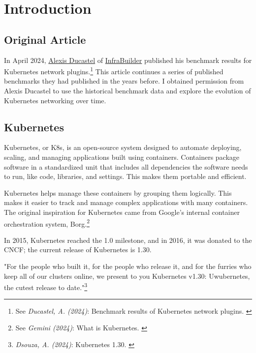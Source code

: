 %
%

\pagebreak
\section{Introduction}

\onehalfspacing

\subsection{Original Article}

In April 2024, \href{https://www.linkedin.com/in/alexisducastel/}{Alexis Ducastel} of \href{https://infrabuilder.com/}{InfraBuilder} published his benchmark results for Kubernetes network plugins.\footnote{See \textit{Ducastel, A. (2024)}: Benchmark results of Kubernetes network plugins. \cite{originalArticle}} This article continues a series of published benchmarks they had published in the years before. I obtained permission from Alexis Ducastel to use the historical benchmark data and explore the evolution of Kubernetes networking over time.

\subsection{Kubernetes}

Kubernetes, or K8s, is an open-source system designed to automate deploying, scaling, and managing applications built using containers. Containers package software in a standardized unit that includes all dependencies the software needs to run, like code, libraries, and settings. This makes them portable and efficient.

Kubernetes helps manage these containers by grouping them logically. This makes it easier to track and manage complex applications with many containers. The original inspiration for Kubernetes came from Google's internal container orchestration system, Borg.\footnote{See \textit{Gemini (2024)}: What is Kubernetes. \cite{bardKubernetes}} 

In 2015, Kubernetes reached the 1.0 milestone, and in 2016, it was donated to the CNCF; the current release of Kubernetes is 1.30.

"For the people who built it, for the people who release it, and for the furries who keep all of our clusters online, we present to you Kubernetes v1.30: Uwubernetes, the cutest release to date."\footnote{\textit{Dsouza, A. (2024)}: Kubernetes 1.30. \cite{uwubernetes}}

